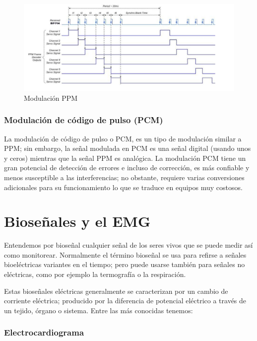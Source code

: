 \begin{figure}[H]
	\center
	\includegraphics[scale=0.5]{imagenes/EstadodelArte/ppm.png}
	\caption{Modulación PPM}
	\label{fig:PWM}
\end{figure}

\subsubsection{Modulación de código de pulso (PCM)}

La modulación de código de pulso o PCM, es un tipo de modulación similar a PPM; sin embargo, la señal modulada en PCM es una señal digital (usando unos y ceros) mientras que la señal PPM es analógica. La modulación PCM tiene un gran potencial de detección de errores e incluso de corrección, es más confiable y menos susceptible a las interferencias; no obstante, requiere varias conversiones adicionales para su funcionamiento lo que se traduce en equipos muy costosos.


\section{Bioseñales y el EMG}

Entendemos por bioseñal \cite{nait2009advanced} cualquier señal de los seres vivos que se puede medir así como monitorear. Normalmente el término bioseñal se usa para refirse a señales bioeléctricas variantes en el tiempo; pero puede usarse también para señales no eléctricas, como por ejemplo la termografía o la respiración.\newline

Estas bioseñales eléctricas generalmente se caracterizan por un cambio de corriente eléctrica; producido por la diferencia de potencial eléctrico a través de un tejido, órgano o sistema. Entre las más conocidas tenemos: 

\subsubsection{Electrocardiograma}


